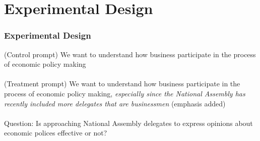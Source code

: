 \documentclass{beamer}
\begin{document}
\section{Experimental Design}
\begin{frame}
\frametitle{Experimental Design}

(Control prompt) We want to understand how business participate in the process of economic policy making\\~\\

(Treatment prompt) We want to understand how business participate in the process of economic policy making, \textit{especially since the National Assembly has recently included more delegates that are businessmen} (emphasis added)\\~\\

Question: Is approaching National Assembly delegates to express opinions about economic polices effective or not?

\end{frame}
\end{document}
